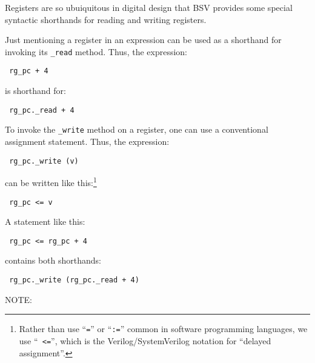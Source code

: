 Registers are so ubuiquitous in digital design that BSV provides some
special syntactic shorthands for reading and writing registers.

Just mentioning a register in an expression can be used as a shorthand
for invoking its \verb|_read| method.  Thus, the expression:

\begin{tabbing}\small\tt
\hmmmm  rg\_pc + 4
\end{tabbing}

is shorthand for:

\begin{tabbing}\small\tt
\hmmmm  rg\_pc.\_read + 4
\end{tabbing}

To invoke the \verb|_write| method on a register, one can use a
conventional assignment statement.  Thus, the expression:

\begin{tabbing}\small\tt
\hmmmm rg\_pc.\_write (v)
\end{tabbing}

can be written like this:\footnote{Rather than use ``{\tt =}'' or
``{\tt :=}'' common in software programming languages, we use ``{\tt
<=}'', which is the Verilog/SystemVerilog notation for ``delayed
assignment''.}

\begin{tabbing}\small\tt
\hmmmm rg\_pc <= v
\end{tabbing}

A statement like this:

\begin{tabbing}\small\tt
\hmmmm rg\_pc <= rg\_pc + 4
\end{tabbing}

contains both shorthands:

\begin{tabbing}\small\tt
\hmmmm rg\_pc.\_write (rg\_pc.\_read + 4)
\end{tabbing}

\vspace{2ex}

NOTE:

